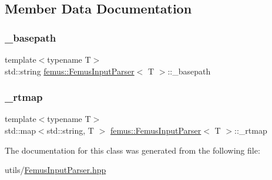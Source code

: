 \subsection{Member Data Documentation}
\mbox{\label{classfemus_1_1_femus_input_parser_a7bc03b4cb89200a0c76547e3f169c8d3}} 
\subsubsection{\texorpdfstring{\+\_\+basepath}{\_basepath}}
{\footnotesize\ttfamily template$<$typename T$>$ \\
std\+::string \mbox{\hyperlink{classfemus_1_1_femus_input_parser}{femus\+::\+Femus\+Input\+Parser}}$<$ T $>$\+::\+\_\+basepath}

\mbox{\label{classfemus_1_1_femus_input_parser_ab5d6ea57ed37959267aa8cf3909d1422}} 
\subsubsection{\texorpdfstring{\+\_\+rtmap}{\_rtmap}}
{\footnotesize\ttfamily template$<$typename T$>$ \\
std\+::map$<$std\+::string, T $>$ \mbox{\hyperlink{classfemus_1_1_femus_input_parser}{femus\+::\+Femus\+Input\+Parser}}$<$ T $>$\+::\+\_\+rtmap}



The documentation for this class was generated from the following file\+:\begin{DoxyCompactItemize}
\item 
utils/\mbox{\hyperlink{_femus_input_parser_8hpp}{Femus\+Input\+Parser.\+hpp}}\end{DoxyCompactItemize}
